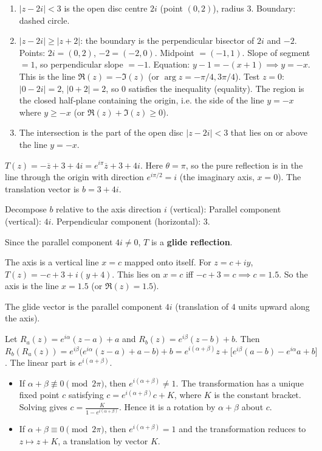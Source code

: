 \documentclass[11pt]{article}
\begin{document}
\begin{corrige}[Exercise 1]
\begin{enumerate}
\item $|z-2i|<3$ is the open disc centre $2i$ (point $(0,2)$), radius $3$.  Boundary: dashed circle.
\item $|z-2i|\ge|z+2|$: the boundary is the perpendicular bisector of $2i$ and $-2$.  Points: $2i=(0,2)$, $-2=(-2,0)$.  Midpoint $=(-1,1)$.  Slope of segment $=1$, so perpendicular slope $=-1$.  Equation: $y-1 = -(x+1) \implies y = -x$.  This is the line $\Re(z)=-\Im(z)$ (or $\arg z = -\pi/4, 3\pi/4$).  Test $z=0$: $|0-2i|=2$, $|0+2|=2$, so $0$ satisfies the inequality (equality).  The region is the closed half‑plane containing the origin, i.e. the side of the line $y=-x$ where $y \ge -x$ (or $\Re(z)+\Im(z)\ge 0$).
\item The intersection is the part of the open disc $|z-2i|<3$ that lies on or above the line $y=-x$.
\end{enumerate}
\end{corrige}

\begin{corrige}[Exercise 2]
$T(z)=-\overline{z}+3+4i = e^{i\pi}\overline{z}+3+4i$.  Here $\theta=\pi$, so the pure reflection is in the line through the origin with direction $e^{i\pi/2}=i$ (the imaginary axis, $x=0$).  The translation vector is $b=3+4i$.

Decompose $b$ relative to the axis direction $i$ (vertical):
Parallel component (vertical): $4i$.
Perpendicular component (horizontal): $3$.

Since the parallel component $4i \neq 0$, $T$ is a \textbf{glide reflection}.

The axis is a vertical line $x=c$ mapped onto itself.  For $z=c+iy$, $T(z) = -c+3 + i(y+4)$.  This lies on $x=c$ iff $-c+3=c \implies c=1.5$.  So the axis is the line $x=1.5$ (or $\Re(z)=1.5$).

The glide vector is the parallel component $4i$ (translation of $4$ units upward along the axis).
\end{corrige}

\begin{corrige}[Exercise 3]
Let $R_a(z)=e^{i\alpha}(z-a)+a$ and $R_b(z)=e^{i\beta}(z-b)+b$.
Then $R_b(R_a(z)) = e^{i\beta}\bigl(e^{i\alpha}(z-a)+a - b\bigr) + b = e^{i(\alpha+\beta)}z + \bigl[ e^{i\beta}(a-b) - e^{i\alpha}a + b \bigr]$.
The linear part is $e^{i(\alpha+\beta)}$.
\begin{itemize}
\item If $\alpha+\beta \not\equiv 0 \pmod{2\pi}$, then $e^{i(\alpha+\beta)}\neq 1$.  The transformation has a unique fixed point $c$ satisfying $c = e^{i(\alpha+\beta)}c + K$, where $K$ is the constant bracket.  Solving gives $c = \frac{K}{1-e^{i(\alpha+\beta)}}$.  Hence it is a rotation by $\alpha+\beta$ about $c$.
\item If $\alpha+\beta \equiv 0 \pmod{2\pi}$, then $e^{i(\alpha+\beta)}=1$ and the transformation reduces to $z \mapsto z + K$, a translation by vector $K$.
\end{itemize}
\end{corrige}
\end{document}
